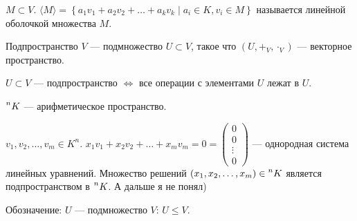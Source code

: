 \begin{definition}
    $M \subset V$.  $\langle M \rangle = \left\{ a_1v_1 + a_2v_2 + \ldots + a_k v_k \mid a_i \in K, v_i \in M\right\}$ называется линейной оболочкой множества $M$.
\end{definition}
\begin{definition}
    Подпространство $V$ --- подмножество  $U \subset V$, такое что  $(U, +_V, \cdot_V)$ --- векторное пространство. 
\end{definition}
\begin{statement}
    $U \subset V$ --- подпространство  $\iff$ все операции с элементами  $U$ лежат в $U$.
\end{statement}
\begin{example}
    $\prescript{n}{}{K}$ --- арифметическое пространство.

    $v_1, v_2, \ldots, v_m \in K^n$. $x_1v_1+x_2v_2+\ldots+x_mv_m = 0 = \begin{pmatrix} 0 \\ 0 \\ \vdots \\ 0 \end{pmatrix}$ --- однородная система линейных уравнений. Множество решений $(x_1, x_2, \ldots, x_m) \in \prescript{n}{}{K}$ является подпространством в $\prescript{n}{}{K}$. А дальше я не понял)
\end{example}
\slashn

Обозначение: $U$ --- подмножество  $V$:  $U \le V$.

